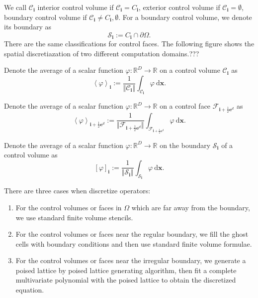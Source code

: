 We call $\mathcal{C}_{\mathbf{i}}$ interior control volume if
$\mathcal{C}_{\mathbf{i}} = C_{\mathbf{i}}$, exterior control volume
if $\mathcal{C}_{\mathbf{i}}=\emptyset$, boundary control volume if
$\mathcal{C}_{\mathbf{i}}\neq C_{\mathbf{i}},\emptyset$. For a
boundary control volume, we denote its boundary as
\begin{equation}
  \label{eq:boundaryOfvolume}
  \mathcal{S}_{\mathbf{i}} := {C}_{\mathbf{i}}\cap\partial\Omega.
\end{equation}
There are the same classifications for control faces. The following
figure shows the spatial discretiazation of two different computation
domains.???

\begin{defn}
  Denote the average of a scalar function
  $\varphi:\mathbb{R}^D\rightarrow\mathbb{R}$ on a control volume
  $\mathcal{C}_{\mathbf{i}}$ as
  \begin{equation}
    \left<\varphi\right>_{\mathbf{i}} := \frac{1}{\Vert
      \mathcal{C}_{\mathbf{i}}\Vert}\int_{\mathcal{C}_{\mathbf{i}}}
    \varphi\  \mathrm{d}\mathbf{x}.
  \end{equation}
\end{defn}

\begin{defn}
  Denote the average of a scalar function
  $\varphi:\mathbb{R}^D\rightarrow\mathbb{R}$ on a control face
  $\mathcal{F}_{\mathbf{i}+\frac{1}{2}\mathbf{e}^d}$ as
  \begin{equation}
    \left<\varphi\right>_{\mathbf{i}+\frac{1}{2}\mathbf{e}^d} := \frac{1}{\Vert
      \mathcal{F}_{\mathbf{i}+\frac{1}{2}\mathbf{e}^d}\Vert}\int_{\mathcal{F}_{\mathbf{i}+\frac{1}{2}\mathbf{e}^d}}\varphi\
    \mathrm{d}\mathbf{x}.  
  \end{equation}
\end{defn}

\begin{defn}
  Denote the average of a scalar function
  $\varphi:\mathbb{R}^D\rightarrow\mathbb{R}$ on the boundary
  $\mathcal{S}_{\mathbf{i}}$ of a control volume as
  \begin{equation}
    \left[\varphi\right]_{\mathbf{i}} := \frac{1}{\Vert
      \mathcal{S}_{\mathbf{i}}\Vert}\int_{\mathcal{S}_{\mathbf{i}}}
    \varphi\  \mathrm{d}\mathbf{x}.
  \end{equation}
\end{defn}


There are three cases when discretize operators:
\begin{enumerate}
\item For the control volumes or faces in $\Omega$ which are far away
  from the boundary, we use standard finite volume stencils.
\item For the control volumes or faces near the regular boundary, we
  fill the ghost cells with boundary conditions and then use standard
  finite volume formulae.
\item For the control volumes or faces near the irregular boundary, we
  generate a poised lattice by poised lattice
  generating algorithm, then fit a complete
  multivariate polynomial with the poised lattice to obtain the
  discretized equation.
\end{enumerate}

